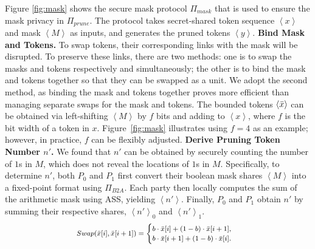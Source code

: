 Figure \ref{fig:mask} shows the secure mask protocol $\Pi_{mask}$ that is used to ensure the mask privacy in $\Pi_{prune}$. The protocol takes secret-shared token sequence $\left \langle x \right \rangle$ and mask $\left \langle M \right \rangle$ as inputs, and generates the pruned tokens $\left \langle y \right \rangle $. %
 \textbf{Bind Mask and Tokens.}  To swap tokens, their corresponding links with the mask will be disrupted. To preserve these links, there are two methods: one is to swap the masks and tokens respectively and simultaneously; the other is to bind the mask and tokens together so that they can be swapped as a unit. We adopt the second method, as binding the mask and tokens together proves more efficient than managing separate swaps for the mask and tokens. The bounded tokens $\left \langle \Bar{x} \right \rangle$ can be obtained via left-shifting $\left \langle M \right \rangle$ by $f$ bits and adding to $\left \langle x \right \rangle$, where $f$ is the bit width of a token in $x$. Figure~\ref{fig:mask} illustrates using $f=4$ as an example; however, in practice, $f$ can be flexibly adjusted.  \textbf{Derive Pruning Token Number $n'$.} We found that $n'$ can be obtained by securely counting the number of $1$s in $M$, which does not reveal the locations of $1$s in $M$. Specifically, to determine $n'$, both $P_0$ and $P_1$ first convert their boolean mask shares $\left \langle M \right \rangle$ into a fixed-point format using $\Pi_{B2A}$. Each party then locally computes the sum of the arithmetic mask using ASS, yielding $\left \langle n' \right \rangle$. Finally, $P_0$ and $P_1$ obtain $n'$ by summing their respective shares, $\left \langle n' \right \rangle_{0}$ and $\left \langle n' \right \rangle_{1}$.  
\begin{equation}
\footnotesize
\label{e:swap}
\begin{aligned}
Swap(\Bar{x}[i],\Bar{x}[i+1]) = 
\begin{cases}
    b \cdot \Bar{x}[i] + (1-b) \cdot \Bar{x}[i+1], \\
      b \cdot \Bar{x}[i+1] + (1-b) \cdot \Bar{x}[i].
\end{cases}
\end{aligned}
\end{equation}

